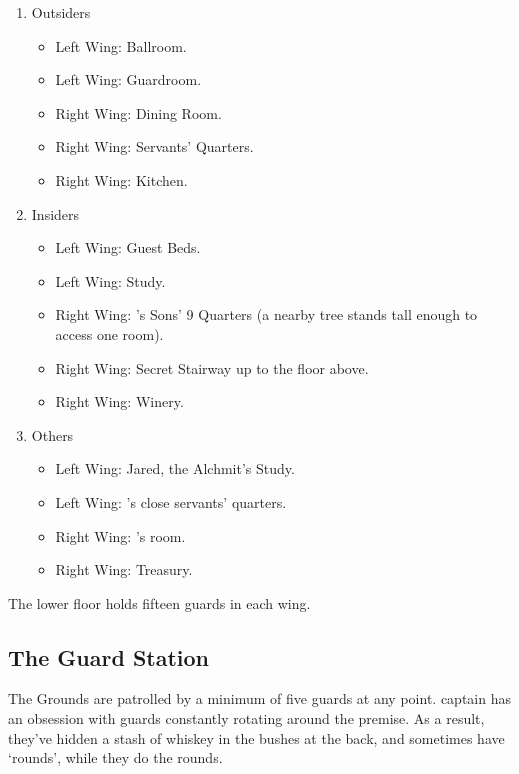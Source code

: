 \begin{enumerate}

	\item{Outsiders}
		\begin{itemize}
			\item{Left Wing: Ballroom.}
			\item{Left Wing: Guardroom.}
			\item{Right Wing: Dining Room.}
			\item{Right Wing: Servants' Quarters.}
			\item{Right Wing: Kitchen.}
		\end{itemize}
	\item{Insiders}
		\begin{itemize}
			\item{Left Wing: Guest Beds.}
			\item{Left Wing: Study.}
			\item{Right Wing: 's Sons' 9 Quarters (a nearby tree stands tall enough to access one room).}
			\item{Right Wing: Secret Stairway up to the floor above.}
			\item{Right Wing: Winery.}
		\end{itemize}

	\item{Others}
		\begin{itemize}
			\item{Left Wing: Jared, the Alchmit's Study.}
			\item{Left Wing: 's close servants' quarters.}
			\item{Right Wing: 's room.}
			\item{Right Wing: Treasury.}
		\end{itemize}

\end{enumerate}


The lower floor holds fifteen guards in each wing.

\humansoldier


\humandiplomat


\humanalchemist

\subsection{The Guard Station}\label{guardstation}
The Grounds are patrolled by a minimum of five guards at any point.  \Gls{captain} has an obsession with guards constantly rotating around the premise.  As a result, they've hidden a stash of whiskey in the bushes at the back, and sometimes have `rounds', while they do the rounds.

